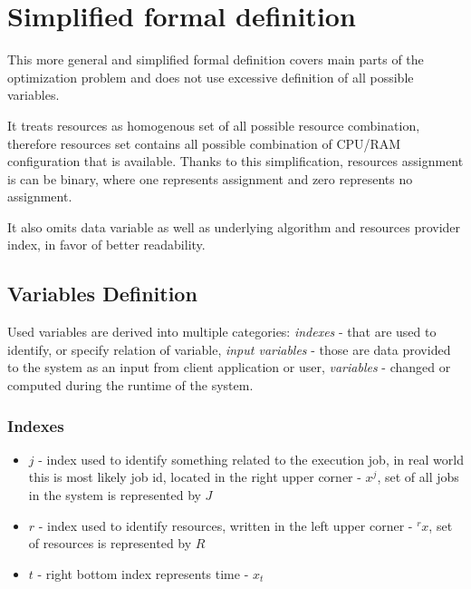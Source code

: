 
\section{Simplified formal definition}\label{sec:formal-definition-simplified}
This more general and simplified formal definition covers main parts of the optimization problem 
and does not use excessive definition of all possible variables.

It treats resources as homogenous set of all possible resource combination,
therefore resources set contains all possible combination of CPU/RAM configuration that is available.
Thanks to this simplification, resources assignment is can be binary,
where one represents assignment and zero represents no assignment.

It also omits data variable as well as underlying algorithm and resources provider index, 
in favor of better readability.


\subsection{Variables Definition}\label{subsec:variables-definition}
Used variables are derived into multiple categories: 
\textit{indexes} - that are used to identify, or specify relation of variable, 
\textit{input variables} - those are data provided to the system as an input from client application or user,
\textit{variables} - changed or computed during the runtime of the system.

\subsubsection{Indexes}
\begin{itemize}
	\item $j$ - index used to identify something related to the execution job,
	      in real world this is most likely job id, located in the right upper corner - $x^{j}$, 
	      set of all jobs in the system is represented by $J$
	\item $r$ - index used to identify resources, written in the left upper corner - ${}^{r}x$, set of resources is represented by $R$
	\item $t$ - right bottom index represents time - $x_t$
\end{itemize}

